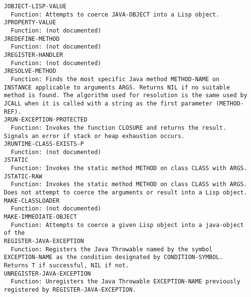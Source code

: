 \begin{verbatim}
JOBJECT-LISP-VALUE
  Function: Attempts to coerce JAVA-OBJECT into a Lisp object.
JPROPERTY-VALUE
  Function: (not documented)
JREDEFINE-METHOD
  Function: (not documented)
JREGISTER-HANDLER
  Function: (not documented)
JRESOLVE-METHOD
  Function: Finds the most specific Java method METHOD-NAME on INSTANCE applicable to arguments ARGS. Returns NIL if no suitable method is found. The algorithm used for resolution is the same used by JCALL when it is called with a string as the first parameter (METHOD-REF).
JRUN-EXCEPTION-PROTECTED
  Function: Invokes the function CLOSURE and returns the result.  Signals an error if stack or heap exhaustion occurs.
JRUNTIME-CLASS-EXISTS-P
  Function: (not documented)
JSTATIC
  Function: Invokes the static method METHOD on class CLASS with ARGS.
JSTATIC-RAW
  Function: Invokes the static method METHOD on class CLASS with ARGS. Does not attempt to coerce the arguments or result into a Lisp object.
MAKE-CLASSLOADER
  Function: (not documented)
MAKE-IMMEDIATE-OBJECT
  Function: Attempts to coerce a given Lisp object into a java-object of the
REGISTER-JAVA-EXCEPTION
  Function: Registers the Java Throwable named by the symbol EXCEPTION-NAME as the condition designated by CONDITION-SYMBOL.  Returns T if successful, NIL if not.
UNREGISTER-JAVA-EXCEPTION
  Function: Unregisters the Java Throwable EXCEPTION-NAME previously registered by REGISTER-JAVA-EXCEPTION.

\end{verbatim}
